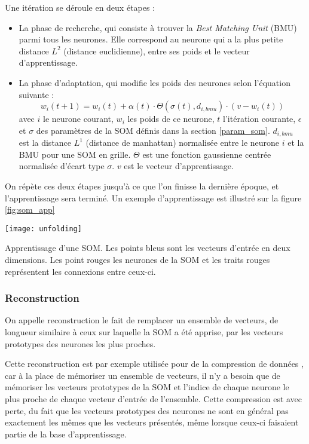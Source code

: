 	Une itération se déroule en deux étapes : 
	\begin{itemize}
		\item La phase de recherche, qui consiste à trouver la \textit{Best Matching Unit} (BMU) parmi tous les neurones. Elle correspond au neurone qui a la plus petite distance $L^2$ (distance euclidienne), entre ses poids et le vecteur d'apprentissage.
		\item La phase d'adaptation, qui modifie les poids des neurones selon l'équation suivante :
		\begin{equation}\label{eq:SOM}
			w_i(t+1) = w_i(t)+\alpha(t)\cdot\Theta(\sigma(t),d_{i,bmu})\cdot(v-w_i(t))
		\end{equation} avec $i$ le neurone courant, $w_i$ les poids de ce neurone, $t$ l'itération courante, $\epsilon$ et $\sigma$ des paramètres de la SOM définis dans la section \ref{param_som}. $d_{i, bmu}$ est la distance $L^1$ (distance de manhattan) normalisée entre le neurone $i$ et la BMU pour une SOM en grille. $\Theta$ est une fonction gaussienne centrée normalisée d'écart type $\sigma$. $v$ est le vecteur d'apprentissage.
	\end{itemize}

	On répète ces deux étapes jusqu'à ce que l'on finisse la dernière époque, et l'apprentissage sera terminé. Un exemple d'apprentissage est illustré sur la figure \ref{fig:som_app}

	\begin{figureth}
		\texttt{[image: unfolding]}
		\caption[Apprentissage de SOM]{Apprentissage d'une SOM. Les points bleus sont les vecteurs d'entrée en deux dimensions. Les point rouges les neurones de la SOM et les traits rouges représentent les connexions entre ceux-ci.}\label{fig:som_app}
	\end{figureth}


\subsubsection{Reconstruction}
	
	On appelle reconstruction le fait de remplacer un ensemble de vecteurs, de longueur similaire à ceux sur laquelle la SOM a été apprise, par les vecteurs prototypes des neurones les plus proches.

	Cette reconstruction est par exemple utilisée pour de la compression de données \cite{ettaouil2012improved}, car à la place de mémoriser un ensemble de vecteurs, il n'y a besoin que de mémoriser les vecteurs prototypes de la SOM et l'indice de chaque neurone le plus proche de chaque vecteur d'entrée de l'ensemble. Cette compression est avec perte, du fait que les vecteurs prototypes des neurones ne sont en général pas exactement les mêmes que les vecteurs présentés, même lorsque ceux-ci faisaient partie de la base d'apprentissage.

